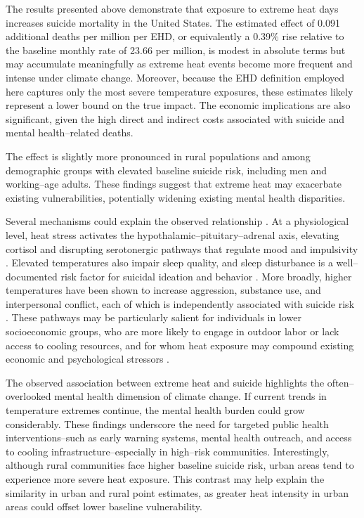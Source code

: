 \documentclass[12pt, a4paper]{article}
\begin{document}
The results presented above demonstrate that exposure to extreme heat days increases suicide mortality in the United States. The estimated effect of 0.091 additional deaths per million per EHD, or equivalently a 0.39\% rise relative to the baseline monthly rate of 23.66 per million, is modest in absolute terms but may accumulate meaningfully as extreme heat events become more frequent and intense under climate change. Moreover, because the EHD definition employed here captures only the most severe temperature exposures, these estimates likely represent a lower bound on the true impact. The economic implications are also significant, given the high direct and indirect costs associated with suicide and mental health--related deaths.

The effect is slightly more pronounced in rural populations and among demographic groups with elevated baseline suicide risk, including men and working--age adults. These findings suggest that extreme heat may exacerbate existing vulnerabilities, potentially widening existing mental health disparities.

Several mechanisms could explain the observed relationship \cite{Berry2010}. At a physiological level, heat stress activates the hypothalamic--pituitary--adrenal axis, elevating cortisol and disrupting serotonergic pathways that regulate mood and impulsivity \cite{rony2023}. Elevated temperatures also impair sleep quality, and sleep disturbance is a well--documented risk factor for suicidal ideation and behavior \cite{mindHeatEffect}. More broadly, higher temperatures have been shown to increase aggression, substance use, and interpersonal conflict, each of which is independently associated with suicide risk \cite{Hsiang2013}. These pathways may be particularly salient for individuals in lower socioeconomic groups, who are more likely to engage in outdoor labor or lack access to cooling resources, and for whom heat exposure may compound existing economic and psychological stressors \cite{burke2018}.

The observed association between extreme heat and suicide highlights the often--overlooked mental health dimension of climate change. If current trends in temperature extremes continue, the mental health burden could grow considerably. These findings underscore the need for targeted public health interventions--such as early warning systems, mental health outreach, and access to cooling infrastructure--especially in high--risk communities. Interestingly, although rural communities face higher baseline suicide risk, urban areas tend to experience more severe heat exposure. This contrast may help explain the similarity in urban and rural point estimates, as greater heat intensity in urban areas could offset lower baseline vulnerability.
\end{document}
